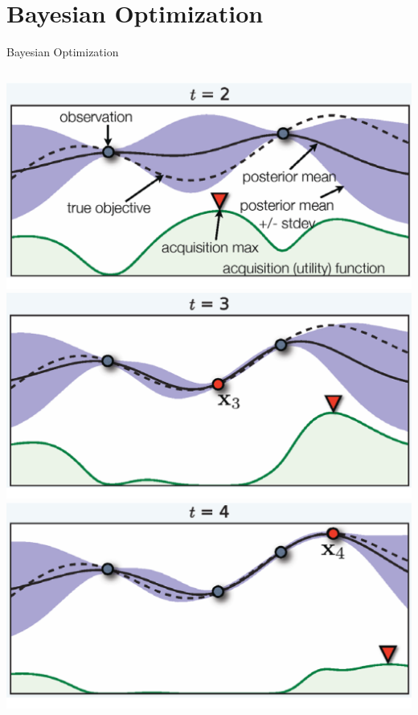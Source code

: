 \section{Bayesian Optimization}
\begin{frame}[c,fragile]{Bayesian Optimization }

\begin{columns}


\includegraphics[width=\textwidth]{images/bo_pic1.png}\\
\pause
\includegraphics[width=\textwidth]{images/bo_pic2.png}\\
\pause
\includegraphics[width=\textwidth]{images/bo_pic3.png}
\pause


\end{columns}
\end{frame}
